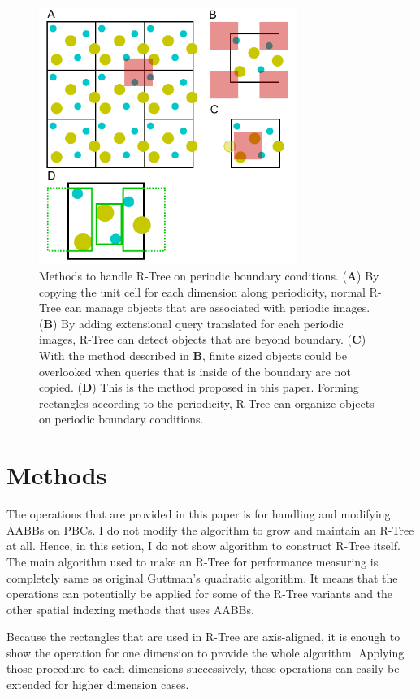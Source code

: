 \documentclass[10pt,letterpaper,twocolumn]{article}
\begin{document}
\begin{figure}[hbt]
    \includegraphics[width=8.4cm, bb=6 3 220 224]{fig1.eps}
    \caption{Methods to handle R-Tree on periodic boundary conditions.
    (\textbf{A})
    By copying the unit cell for each dimension along periodicity, normal R-Tree
    can manage objects that are associated with periodic images.
    (\textbf{B})
    By adding extensional query translated for each periodic images, R-Tree can
    detect objects that are beyond boundary.
    (\textbf{C})
    With the method described in \textbf{B}, finite sized objects could be
    overlooked when queries that is inside of the boundary are not copied.
    (\textbf{D})
    This is the method proposed in this paper. Forming rectangles according to
    the periodicity, R-Tree can organize objects on periodic boundary
    conditions.}
    \label{fig-method-rtree-pbc}
\end{figure}

\section*{Methods}

The operations that are provided in this paper is for handling and modifying
AABBs on PBCs.
I do not modify the algorithm to grow and maintain an R-Tree at all.
Hence, in this setion, I do not show algorithm to construct R-Tree itself.
The main algorithm used to make an R-Tree for performance measuring is
completely same as original Guttman's quadratic algorithm.
It means that the operations can potentially be applied for some of the R-Tree
variants and the other spatial indexing methods that uses AABBs.

Because the rectangles that are used in R-Tree are axis-aligned, it is
enough to show the operation for one dimension to provide the whole algorithm.
Applying those procedure to each dimensions successively, these operations can
easily be extended for higher dimension cases.
\end{document}
